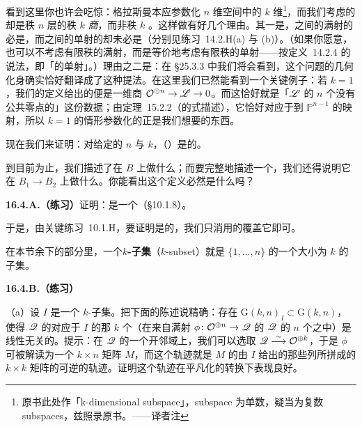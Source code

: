 看到这里你也许会吃惊：格拉斯曼本应参数化 $n$ 维空间中的 $k$ 维\trSubspace{}\footnote{原书此处作「k-dimensional subspace」，subspace 为单数，疑当为复数 subspaces，兹照录原书。——译者注}，而我们考虑的却是秩 $n$ 层的秩 $k$ \emph{商}，而非秩 $k$ \emph{\trSubobject}。这样做有好几个理由。其一是，\trLocallyFreeSheaf{}之间的满射的\trKernel{}必是\trLocallyFreeSheaf，而\trLocallyFreeSheaf{}之间的单射的\trCokernel{}却未必是\trLocallyFreeSheaf{}（分别见\mbox{练习~14.2.H}(a) 与 (b)）。（如果你愿意，也可以不考虑有限秩\trLocallyFreeSheaf{}的满射，而是等价地考虑有限秩\trLocallyFreeSheaf{}的单射——按\mbox{定义~14.2.4} 的说法，即「\trVectorBundle{}的单射」。）理由之二是：在 \S25.3.3 中我们将会看到，这个问题的几何化身确实恰好翻译成了这种提法。在这里我们已然能看到一个关键例子：若 $k=1$，我们的定义给出的便是一维商 $\mathcal{O}^{\oplus n}\to\mathscr{L}\to 0$。而这恰好就是「$\mathscr{L}$ 的 $n$ 个没有公共零点的\trSection{}」这份数据；由\mbox{定理~15.2.2}（\trProjectiveSpace{}的\trFunctor{}式描述），它恰好对应于到 $\mathbb{P}^{n-1}$ 的映射，所以 $k=1$ 的情形参数化的正是我们想要的东西。

现在我们来证明：对给定的 $n$ 与 $k$，\trGrassmannian{}（\trContravariantFunctor）是\trRepresentable{}的。

到目前为止，我们描述了\trGrassmannian{}\trFunctor{}在\emph{\trObject} $B$ 上做什么；而要完整地描述一个\trFunctor，我们还得说明它在\emph{\trMorphism} $B_1\to B_2$ 上做什么。你能看出这个定义必然是什么吗？

\textbf{16.4.A.（练习）}\quad 证明：\trGrassmannian{}\trFunctor{}是一个\trZariskiSheaf（\S10.1.8）。

于是，由\mbox{关键练习~10.1.H}，要证明\trGrassmannian{}\trFunctor{}是\trRepresentable{}的，我们只消用\trRepresentable{}的\trOpen\trSubfunctor{}覆盖它即可。

在本节余下的部分里，一个\textbf{$k$-子集}（$k$-subset）就是 $\{1,\dots,n\}$ 的一个大小为 $k$ 的子集。

\textbf{16.4.B.（练习）}

（a）设 $I$ 是一个 $k$-子集。把下面的陈述说精确：存在\trOpen\trSubfunctor{} $\mathrm{G}(k,n)_I\subset\mathrm{G}(k,n)$，使得 $\mathscr{Q}$ 的对应于 $I$ 的那 $k$ 个\trSection{}（在来自满射 $\phi\colon\mathcal{O}^{\oplus n}\to\mathscr{Q}$ 的 $\mathscr{Q}$ 的 $n$ 个\trSection{}之中）是线性无关的。提示：在 $\mathscr{Q}$ 的一个\trTrivialization{}开邻域上，我们可以选取\trIsomorphism{} $\mathscr{Q}\overset{\sim}{\longrightarrow}\mathcal{O}^{\oplus k}$，于是 $\phi$ 可被解读为一个 $k\times n$ 矩阵 $M$，而这个轨迹就是 $M$ 的由 $I$ 给出的那些列所拼成的 $k\times k$ 矩阵的\trDeterminant{}可逆的轨迹。证明这个轨迹在平凡化的转换下表现良好。

